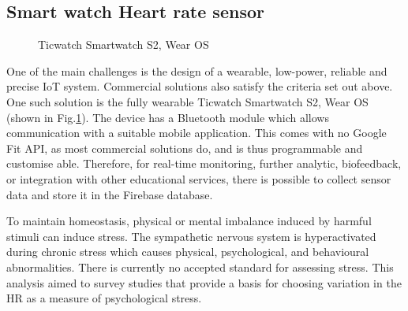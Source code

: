 \subsection{Smart watch Heart rate sensor}
\begin{figure}[hbt!] 
  \centering
  \qquad
  \caption[Ticwatch Smartwatch S2, Wear OS ]{Ticwatch Smartwatch S2, Wear OS}
  \label{fig:Ticwatch}
\end{figure}
One of the main challenges is the design of a wearable, low-power, reliable and precise \acs{IoT} system. Commercial solutions also satisfy the criteria set out above.  One such solution is the fully wearable Ticwatch Smartwatch S2, Wear OS (shown in Fig.\ref{fig:Ticwatch}). The device has a Bluetooth module which allows communication with a suitable mobile application. This comes with no Google Fit API, as most commercial solutions do, and is thus programmable and customise able. Therefore, for real-time monitoring, further analytic, biofeedback, or integration with other educational services, there is possible to collect sensor data and store it in the Firebase database.

To maintain homeostasis, physical or mental imbalance induced by harmful stimuli can induce stress. The sympathetic nervous system is hyperactivated during chronic stress which causes physical, psychological, and behavioural abnormalities. There is currently no accepted standard for assessing stress. This analysis aimed to survey studies that provide a basis for choosing variation in the \acf{HR} as a measure of psychological stress.\citep{Kim2018StressLiterature}

